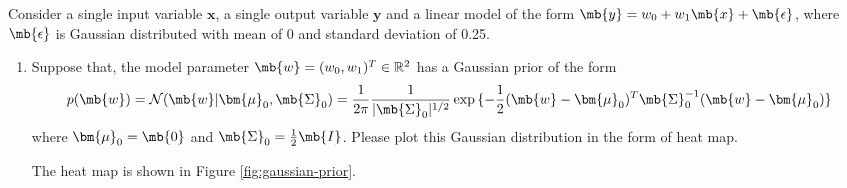 \begin{exercise}\label{Bayesian}
    Consider a single input variable $\textbf{x}$, a single output variable $\textbf{y}$ and a linear model of the form $\mb{y}=w_0+w_1\mb{x}+\mb{\epsilon}$, where $\mb{\epsilon}$ is Gaussian distributed with mean of 0 and standard deviation of 0.25.
    \begin{enumerate}
        \item Suppose that, the model parameter $\mb{w}=(w_0,w_1)^T\in \mathbb{R}^2$ has a Gaussian prior of the form
            $$
                p(\mb{w})=\mathcal{N}(\mb{w}|\bm{\mu}_0,\mb{\Sigma}_0)=\frac{1}{2\pi}\frac{1}{|\mb{\Sigma}_0|^{1/2}}\exp{\{-\frac{1}{2}(\mb{w}-\bm{\mu}_0)^{T}\mb{\Sigma}_0^{-1}(\mb{w}-\bm{\mu}_0)}\}
            $$
            where $\bm{\mu}_0=\mb{0}$ and $\mb{\Sigma}_0=\frac{1}{2}\mb{I}$. Please plot this Gaussian distribution in the form of heat map.
            
            \begin{solution}
                The heat map is shown in Figure \ref{fig:gaussian-prior}.
                \qedhere
            \end{solution}
            

\end{enumerate}
\end{exercise}

